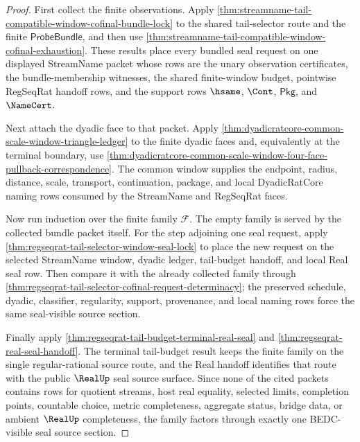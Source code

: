 \begin{proof}
First collect the finite observations. Apply
\autoref{thm:streamname-tail-compatible-window-cofinal-bundle-lock} to the
shared tail-selector route and the finite $\mathsf{ProbeBundle}$, and then use
\autoref{thm:streamname-tail-compatible-window-cofinal-exhaustion}. These
results place every bundled seal request on one displayed StreamName packet
whose rows are the unary observation certificates, the bundle-membership
witnesses, the shared finite-window budget, pointwise RegSeqRat handoff rows,
and the support rows $\hsame$, $\Cont$, $\mathsf{Pkg}$, and $\NameCert$.

Next attach the dyadic face to that packet. Apply
\autoref{thm:dyadicratcore-common-scale-window-triangle-ledger} to the finite
dyadic faces and, equivalently at the terminal boundary, use
\autoref{thm:dyadicratcore-common-scale-window-four-face-pullback-correspondence}.
The common window supplies the endpoint, radius, distance, scale, transport,
continuation, package, and local DyadicRatCore naming rows consumed by the
StreamName and RegSeqRat faces.

Now run induction over the finite family $\mathcal F$. The empty family is
served by the collected bundle packet itself. For the step adjoining one seal
request, apply \autoref{thm:regseqrat-tail-selector-window-seal-lock} to place
the new request on the selected StreamName window, dyadic ledger, tail-budget
handoff, and local Real seal row. Then compare it with the already collected
family through
\autoref{thm:regseqrat-tail-selector-cofinal-request-determinacy}; the
preserved schedule, dyadic, classifier, regularity, support, provenance, and
local naming rows force the same seal-visible source section.

Finally apply \autoref{thm:regseqrat-tail-budget-terminal-real-seal} and
\autoref{thm:regseqrat-real-seal-handoff}. The terminal tail-budget result
keeps the finite family on the single regular-rational source route, and the
Real handoff identifies that route with the public $\RealUp$ seal source
surface. Since none of the cited packets contains rows for quotient streams,
host real equality, selected limits, completion points, countable choice,
metric completeness, aggregate status, bridge data, or ambient $\RealUp$
completeness, the family factors through exactly one BEDC-visible seal source
section.
\end{proof}

